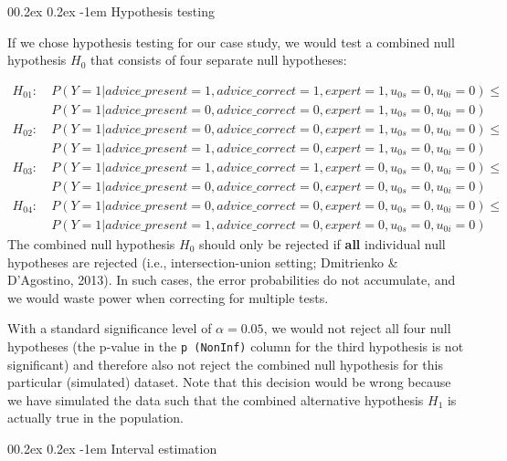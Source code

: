 \documentclass[
  man,floatsintext]{apa6}
\makeatletter
\let\oldparagraph\paragraph
\renewcommand{\paragraph}[1]{\oldparagraph{#1}\mbox{}}
\renewcommand{\paragraph}{\@startsection{paragraph}{4}{\parindent}%
  {0\baselineskip \@plus 0.2ex \@minus 0.2ex}%
  {-1em}%
  {\normalfont\normalsize\bfseries\itshape\typesectitle}}
\makeatother
\begin{document}
\hypertarget{hypothesis-testing}{%
\paragraph{Hypothesis testing}\label{hypothesis-testing}}

If we chose hypothesis testing for our case study, we would test a combined null hypothesis \(H_0\) that consists of four separate null hypotheses:

\[
\begin{aligned}
H_{01}:\ & P(Y=1|advice\_present = 1, advice\_correct = 1, expert = 1, u_{0s} = 0, u_{0i} = 0) \leq \\
& P(Y=1|advice\_present = 0, advice\_correct = 0, expert = 1, u_{0s} = 0, u_{0i} = 0) \\
H_{02}:\ &P(Y=1|advice\_present = 0, advice\_correct = 0, expert = 1, u_{0s} = 0, u_{0i} = 0) \leq \\
& P(Y=1|advice\_present = 1, advice\_correct = 0, expert = 1, u_{0s} = 0, u_{0i} = 0) \\
H_{03}:\ &P(Y=1|advice\_present = 1, advice\_correct = 1, expert = 0, u_{0s} = 0, u_{0i} = 0) \leq \\
& P(Y=1|advice\_present = 0, advice\_correct = 0, expert = 0, u_{0s} = 0, u_{0i} = 0) \\
H_{04}:\ & P(Y=1|advice\_present = 0, advice\_correct = 0, expert = 0, u_{0s} = 0, u_{0i} = 0) \leq \\
& P(Y=1|advice\_present = 1, advice\_correct = 0, expert = 0, u_{0s} = 0, u_{0i} = 0)
\end{aligned}
\]
The combined null hypothesis \(H_0\) should only be rejected if \textbf{all} individual null hypotheses are rejected (i.e., intersection-union setting; Dmitrienko \& D'Agostino, 2013).
In such cases, the error probabilities do not accumulate, and we would waste power when correcting for multiple tests.

With a standard significance level of \(\alpha = 0.05\), we would not reject all four null hypotheses (the p-value in the \texttt{p\ (NonInf)} column for the third hypothesis is not significant) and therefore also not reject the combined null hypothesis for this particular (simulated) dataset.
Note that this decision would be wrong because we have simulated the data such that the combined alternative hypothesis \(H_1\) is actually true in the population.

\hypertarget{interval-estimation}{%
\paragraph{Interval estimation}\label{interval-estimation}}
\end{document}
